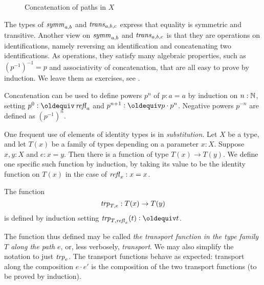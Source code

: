 \begin{figure}
  \centering
  
  \caption{Concatenation of paths in $X$}
  \label{fig:path-concatenation}
\end{figure}

The types of $\mathop{\mathit{symm}}_{a,b}$ and $\mathop{\mathit{trans}}_{a,b,c}$ express that
equality is symmetric and transitive. Another view on
$\mathop{\mathit{symm}}_{a,b}$ and $\mathop{\mathit{trans}}_{a,b,c}$ is that they are
operations on identifications, namely reversing an identification
and concatenating two identifications. As operations, they satisfy
many algebraic properties, such as $(p^{-1})^{-1} = p$ and
associativity of concatenation, that are all easy to prove by induction. 
We leave them as exercises, see \cite[Lemma 2.1.4]{hottbook}. 

Concatenation can be used to define powers $p^n$ of $p:a=a$
by induction on $n:\mathbb{N}$, setting $p^0\defeq\refl{a}$ and
$p^{n+1}\defeq p\cdot p^n$. Negative powers $p^{-n}$ are defined
as $(p^{-1})^n$.

One frequent use of elements of identity types is in \emph{substitution}.  
Let $X$ be a type, and let $T(x)$ be a family of types depending on a
parameter $x:X$.  Suppose $x,y:X$ and $e:x=y$.  
Then there is a function of type $T(x) \to T(y)$. 
We define one specific such function by induction, 
by taking its value to be the identity function on $T(x)$ 
in the case of $\mathop{{\it refl}_{x}}:x=x$.

\begin{definition}\label{def:transport} The function
  \[ 
  \mathop{\mathit{trp}_{T,e}} : T(x) \to T(y)
  \]
  is defined by induction setting $\trp{T,\refl{x}} (t) \defeq t$.
\end{definition} 
The function thus defined may be called 
\emph{the transport function in the type family $T$ along the path $e$}, 
 or, less verbosely, \emph{transport}.
 We may also simplify the notation to just $\mathop{\mathit{trp}_{e}}$.
The transport functions behave as expected: transport along the composition
$e\cdot e'$ is the composition of the two transport functions (to be
 proved by induction).


